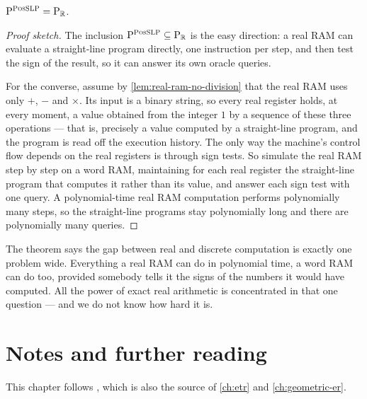 \begin{theorem}
\label{thm:posslp-pr}
$\mathrm{P}^{\textsc{PosSLP}} = \mathrm{P}_{\mathbb{R}}$.
\end{theorem}

\begin{proof}[Proof sketch]
The inclusion $\mathrm{P}^{\textsc{PosSLP}} \subseteq \mathrm{P}_{\mathbb{R}}$ is the
easy direction: a real RAM can evaluate a straight-line program directly, one
instruction per step, and then test the sign of the result, so it can answer
its own oracle queries.

For the converse, assume by \cref{lem:real-ram-no-division} that the real RAM
uses only $+$, $-$ and $\times$. Its input is a binary string, so every real
register holds, at every moment, a value obtained from the integer $1$ by a
sequence of these three operations --- that is, precisely a value computed by a
straight-line program, and the program is read off the execution history. The
only way the machine's control flow depends on the real registers is through
sign tests. So simulate the real RAM step by step on a word RAM, maintaining
for each real register the straight-line program that computes it rather than
its value, and answer each sign test with one  query. A
polynomial-time real RAM computation performs polynomially many steps, so the
straight-line programs stay polynomially long and there are polynomially many
queries.
\end{proof}

\begin{intuition}
The theorem says the gap between real and discrete computation is exactly one
problem wide. Everything a real RAM can do in polynomial time, a word RAM can
do too, provided somebody tells it the signs of the numbers it would have
computed. All the power of exact real arithmetic is concentrated in that one
question --- and we do not know how hard it is.
\end{intuition}

\section{Notes and further reading}
\label{sec:real-models-further-reading}

This chapter follows \citet{Miltzow2026}, which is also the source of
\cref{ch:etr} and \cref{ch:geometric-er}.

